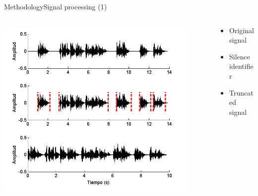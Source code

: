 \documentclass[10pt]{beamer}
\begin{document}
\begin{frame}{Methodology}{Signal processing (1)}
\small {
\vspace{0mm} 
\begin{columns}   
  \begin{column}{0.6\textwidth} 
    \hfill  
    \includegraphics[width=0.9\textwidth]{gfx/filename51}    
  \end{column}
  \begin{column}{0.4\textwidth}
    \vspace{-8mm} 
    \begin{itemize}
      \setlength{\itemindent}{-2em}      
      \itemsep 4.6em    
      \item Original signal
      \item Silence identifier
      \item Truncated signal
    \end{itemize}
  \end{column}   
\end{columns}   
}
\end{frame}
\end{document}

